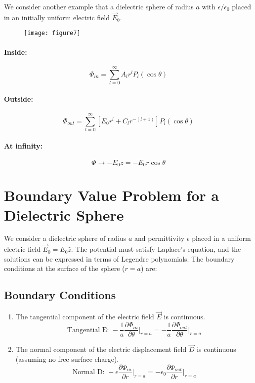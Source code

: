 \documentclass{article}
\begin{document}
	We consider another example that a dielectric sphere of radius $a$ with $\epsilon/\epsilon_0$ placed in an initially uniform electric field $\vec{E}_0$.
	
	\begin{figure}[h]
		\centering
		\texttt{[image: figure7]}
		\caption{}
		\label{fig:figure7}
	\end{figure}
	
	\paragraph{Inside:}
	\[
	\Phi_{in} = \sum_{l=0}^{\infty} A_l r^l P_l(\cos\theta)
	\]
	\paragraph{Outside:}
	\[
	\Phi_{out} = \sum_{l=0}^{\infty} \left[ E_0 r^l + C_l r^{-(l+1)} \right] P_l(\cos\theta)
	\]
	\paragraph{At infinity:}
	\[
	\Phi \to -E_0 z = -E_0 r \cos\theta
	\]
	\section{Boundary Value Problem for a Dielectric Sphere}
	
	We consider a dielectric sphere of radius $a$ and permittivity $\epsilon$ placed in a uniform electric field $\vec{E}_0 = E_0 \hat{z}$. The potential must satisfy Laplace's equation, and the solutions can be expressed in terms of Legendre polynomials. The boundary conditions at the surface of the sphere ($r=a$) are:
	
	\subsection{Boundary Conditions}
	
	\begin{enumerate}
		\item The tangential component of the electric field $\vec{E}$ is continuous.
		\[
		\text{Tangential E: } -\frac{1}{a}\frac{\partial \Phi_{in}}{\partial \theta}\bigg|_{r=a} = -\frac{1}{a}\frac{\partial \Phi_{out}}{\partial \theta}\bigg|_{r=a}
		\]
		
		\item The normal component of the electric displacement field $\vec{D}$ is continuous (assuming no free surface charge).
		\[
		\text{Normal D: } -\epsilon \frac{\partial \Phi_{in}}{\partial r}\bigg|_{r=a} = -\epsilon_0 \frac{\partial \Phi_{out}}{\partial r}\bigg|_{r=a}
		\]
	\end{enumerate}
	
\end{document}
